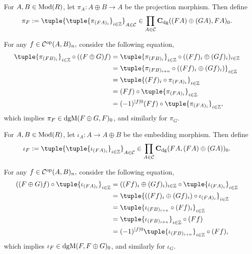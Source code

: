 \begin{remark}
    \label{rem:dgm_pi_iota}
    For \( A, B \in \operatorname{Mod}(R) \), let \( \pi_A: A \oplus B \to A \) be the projection morphism. Then define
    \[
        \pi_F := \tuple{ \tuple{ \pi_{(F A)_i} }_{i \in \Zb} }_{A \in \Cc} \in \prod_{A \in \Cc} \C_{\dg}((F A) \oplus (G A), F A)_0.
    \]

    For any \( f \in {\mathcal{C}}^{\operatorname{op}}(A, B)_n, \) consider the following equation,
    \begin{align*}
        \tuple{ \pi_{(F B)_i} }_{i \in \Zb} \circ ((F \oplus G) f) &= \tuple{ \pi_{(F B)_i} }_{i \in \Zb} \circ ((F f)_i \oplus (G f)_i)_{i \in \Zb} \\
        &= \tuple{ \pi_{(F B)_{i + n}} \circ ((F f)_i \oplus (G f)_i) }_{i \in \Zb} \\
        &= \tuple{ (F f)_i \circ \pi_{(F A)_i} }_{i \in \Zb} \\
        &= (F f) \circ \tuple{ \pi_{(F A)_i} }_{i \in \Zb} \\
        &= (-1)^{|f| 0}(F f) \circ \tuple{ \pi_{(F A)_i} }_{i \in \Zb}, \\
    \end{align*}
    which implies \( \pi_F \in \operatorname{dgM}(F \oplus G, F)_0 \), and similarly for \( \pi_G \).

    For \( A, B \in \operatorname{Mod}(R) \), let \( \iota_A: A \to A \oplus B \) be the embedding morphism. Then define
    \[
        \iota_F := \tuple{ \tuple{ \iota_{(F A)_i} }_{i \in \Zb} }_{A \in \Cc} \in \prod_{A \in \Cc} \C_{\dg}(F A, (F A) \oplus (G A) )_0.
    \]

    For any \( f \in {\mathcal{C}}^{\operatorname{op}}(A, B)_n, \) consider the following equation,
    \begin{align*}
        ((F \oplus G) f) \circ \tuple{ \iota_{(F A)_i} }_{i \in \Zb} &= ((F f)_i \oplus (G f)_i)_{i \in \Zb} \circ \tuple{ \iota_{(F A)_i} }_{i \in \Zb} \\
        &= \tuple{ ((F f)_i \oplus (G f)_i) \circ \iota_{(F A)_i} }_{i \in \Zb} \\
        &= \tuple{ \iota_{(F B)_{i + n}} \circ (F f)_i  }_{i \in \Zb} \\
        &= \tuple{ \iota_{(F B)_{i + n}} }_{i \in \Zb} \circ (F f) \\
        &= (-1)^{|f| 0}\tuple{ \iota_{(F B)_{i + n}} }_{i \in \Zb} \circ (F f), \\
    \end{align*}
    which implies \( \iota_F \in \operatorname{dgM}(F, F \oplus G)_0 \), and similarly for \( \iota_G \).


\end{remark}
